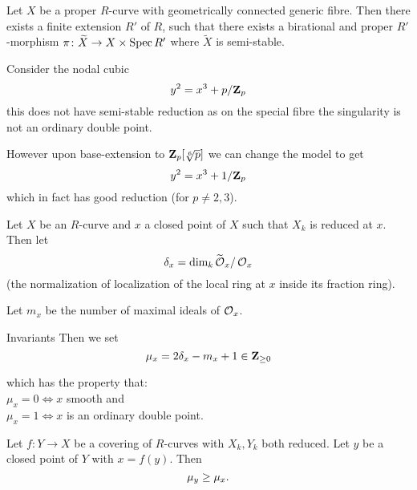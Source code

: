 \begin{frame}
    \begin{theorem}
        Let $X$ be a proper $R$-curve with geometrically connected generic fibre. Then there exists a finite extension $R'$ of $R$, such that there exists a birational and proper $R'$-morphism $\pi  \colon  \widetilde X \to X \times \operatorname{Spec} R'$ where $\widetilde X$ is semi-stable.
    \end{theorem}\pause
    \begin{example}
        Consider the nodal cubic
        $$ y^2 = x^3 + p /\mathbf{Z}_p$$
        this does not have semi-stable reduction as on the special fibre the singularity is not an ordinary double point.

        However upon base-extension to $\mathbf{Z}_p[ \sqrt[6]{p}] $ we can change the model to get
        $$ y^2 = x^3 + 1 /\mathbf{Z}_p$$
        which in fact has good reduction (for $p \ne 2,3$).
    \end{example}
    \end{frame}\begin{frame}
    Let $X$ be an $R$-curve and $x$ a closed point of $X$ such that $X_k$ is reduced at $x$. Then let
    $$ \delta _x = \dim_k \widetilde {\operatorname{\mathcal{O}}}_x/\operatorname{\mathcal{O}}_x $$
    (the normalization of localization of the local ring at $x$ inside its fraction ring).\pause

    Let $m _x$ be the number of maximal ideals of $\operatorname{\mathcal{O}}_x$.\pause
    \end{frame}\begin{frame}{Invariants}
    Then we set
    $$ \mu _x =  2\delta _x - m_x + 1 \in \mathbf{Z}_{\ge 0} $$

    which has the property that:\\ $\mu _x = 0 \iff x$ smooth and\\ $\mu _x  = 1 \iff x $ is  an ordinary double point. \pause

    \begin{proposition}
        Let $f\colon Y \to X$  be a covering of $R$-curves with $X_k,Y_k$ both reduced. Let $y$ be a closed point of $Y$ with $x = f(y)$. Then 
        $$ \mu _y \ge \mu _x\text. $$
    \end{proposition}
\end{frame}

